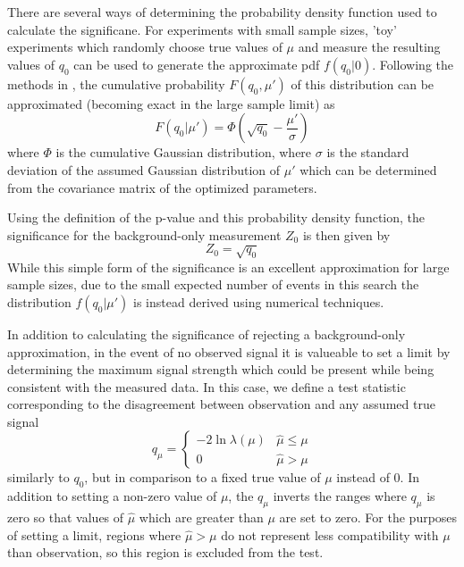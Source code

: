 There are several ways of determining the probability density function used to calculate the significane.
For experiments with small sample sizes, 'toy' experiments which randomly choose true values of $\mu$ and measure the resulting values of $q_0$ can be used to generate the approximate pdf $f(q_0|0)$. 
Following the methods in \cite{Cowan_2011}, the cumulative probability $F(q_0,\mu')$ of this distribution can be approximated (becoming exact in the large sample limit) as 
\begin{equation}
	F(q_0|\mu') = \Phi \left( \sqrt{q_0} - \frac{\mu'}{\sigma} \right)
\end{equation}
where $\Phi$ is the cumulative Gaussian distribution, where $\sigma$ is the standard deviation of the assumed Gaussian distribution of $\mu'$ which can be determined from the covariance matrix of the optimized parameters.

Using the definition of the p-value and this probability density function, the significance for the background-only measurement $Z_0$ is then given by
\begin{equation}
	Z_0 = \sqrt{q_0}
\end{equation} 
While this simple form of the significance is an excellent approximation for large sample sizes, due to the small expected number of events in this search the distribution $f(q_0|\mu')$ is instead derived using numerical techniques.

In addition to calculating the significance of rejecting a background-only approximation, in the event of no observed signal it is valueable to set a limit by determining the maximum signal strength which could be present while being consistent with the measured data.
In this case, we define a test statistic corresponding to the disagreement between observation and any assumed true signal
\begin{equation}
    q_\mu = 
	\begin{cases} 
		-2 \ln \lambda(\mu) & \hat{\mu} \leq \mu\\
                 0                & \hat{\mu} > \mu 
        \end{cases}
\end{equation}
similarly to $q_0$, but in comparison to a fixed true value of $\mu$ instead of 0. 
In addition to setting a non-zero value of $\mu$, the $q_\mu$ inverts the ranges where $q_\mu$ is zero so that values of $\hat{\mu}$ which are greater than $\mu$ are set to zero.
For the purposes of setting a limit, regions where $\hat{\mu}>\mu$ do not represent less compatibility with $\mu$ than observation, so this region is excluded from the test.

